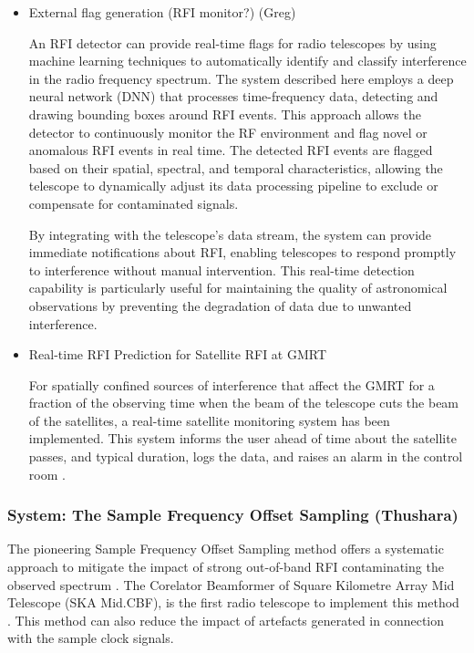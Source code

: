 \begin{itemize}
\item External flag generation (RFI monitor?) (Greg)

An RFI detector can provide real-time flags for radio telescopes by using machine learning techniques to automatically identify and classify interference in the radio frequency spectrum. The system described here \cite{9111666} employs a deep neural network (DNN) that processes time-frequency data, detecting and drawing bounding boxes around RFI events. This approach allows the detector to continuously monitor the RF environment and flag novel or anomalous RFI events in real time. The detected RFI events are flagged based on their spatial, spectral, and temporal characteristics, allowing the telescope to dynamically adjust its data processing pipeline to exclude or compensate for contaminated signals.

By integrating with the telescope’s data stream, the system can provide immediate notifications about RFI, enabling telescopes to respond promptly to interference without manual intervention. This real-time detection capability is particularly useful for maintaining the quality of astronomical observations by preventing the degradation of data due to unwanted interference.

\item Real-time RFI Prediction for Satellite RFI at GMRT

For spatially confined sources of interference that affect the GMRT for a fraction of the observing time when the beam of the telescope cuts the beam of the satellites, a real-time satellite monitoring system has been implemented. This system informs the user ahead of time about the satellite passes, and typical duration, logs the data, and raises an alarm in the control room \cite{raybole2016real}.

\end{itemize}

\subsubsection{System: The Sample Frequency Offset Sampling (Thushara)}

The pioneering Sample Frequency Offset Sampling method offers a systematic approach to mitigate the impact of strong out-of-band RFI contaminating the observed spectrum \cite{carlson_scfo_2017}. The Corelator Beamformer of Square Kilometre Array Mid Telescope (SKA Mid.CBF), is the first radio telescope to implement this method \cite{ska_mid_cbf_rfi_2019}. This method can also reduce the impact of artefacts generated in connection with the sample clock signals. 

